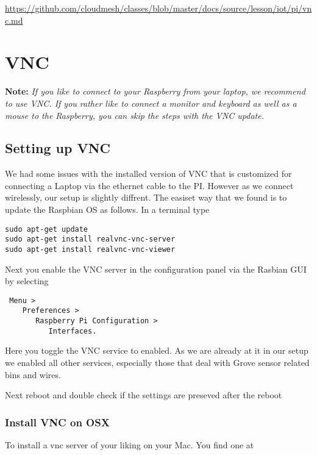 \begin{fileremark}\url{https://github.com/cloudmesh/classes/blob/master/docs/source/lesson/iot/pi/vnc.md}\end{fileremark}
\section{VNC}\label{vnc}

\textbf{Note:} \emph{If you like to connect to your Raspberry from your
laptop, we recommend to use VNC. If you rather like to connect a monitor
and keyboard as well as a mouse to the Raspberry, you can skip the steps
with the VNC update.}

\subsection{Setting up VNC}\label{setting-up-vnc}

We had some issues with the installed version of VNC that is customized
for connecting a Laptop via the ethernet cable to the PI. However as we
connect wirelessly, our setup is slightly diffrent. The easiset way that
we found is to update the Raspbian OS as follows. In a terminal type

\begin{verbatim}
sudo apt-get update
sudo apt-get install realvnc-vnc-server 
sudo apt-get install realvnc-vnc-viewer
\end{verbatim}

Next you enable the VNC server in the configuration panel via the
Rasbian GUI by selecting

\begin{verbatim}
 Menu > 
    Preferences > 
       Raspberry Pi Configuration > 
          Interfaces.
\end{verbatim}

Here you toggle the VNC service to enabled. As we are already at it in
our setup we enabled all other services, especially those that deal with
Grove sensor related bins and wires.

Next reboot and double check if the settings are preseved after the
reboot

\subsubsection{Install VNC on OSX}\label{install-vnc-on-osx}

To install a vnc server of your liking on your Mac. You find one at

